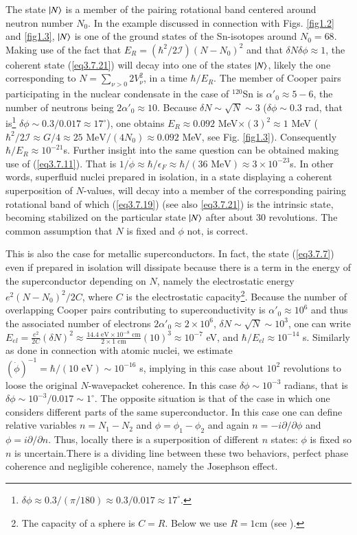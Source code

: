 The state $|{N} \rangle$ is a member of the pairing rotational band centered around neutron number $N_0$. In the example discussed in connection with Figs. \ref{fig1.2} and \ref{fig1.3}, $|{N} \rangle$ is one of the ground states of the Sn-isotopes around $N_0=68$. Making use of the fact that $E_R=\left(\hbar^2/2\mathcal I\right)(N-N_0)^2$ and that $\delta N\delta\phi\approx1$, the coherent state (\ref{eq3.7.21}) will decay into one of the states $|{N} \rangle$, likely the one corresponding to $N=\sum_{\nu>0}2V_\nu^2$, in a time $\hbar/E_R$. The member of  Cooper pairs participating in the nuclear condensate in the case of $^{120}$Sn is $\alpha'_0\approx5-6$, the number of neutrons being $2\alpha'_0\approx10$. Because $\delta N\sim\sqrt{N}\sim3$ ($\delta\phi\sim0.3$ rad, that is\footnote{$\delta\phi\approx0.3/(\pi/180)\approx0.3/0.017\approx17^\circ$.} $\delta\phi\sim0.3/0.017\approx 17^\circ$), one obtains $E_R\approx0.092$ MeV$\times(3)^2\approx 1$ MeV ($\hbar^2/2\mathcal I\approx G/4\approx 25\text{ MeV}/(4N_0)\approx0.092$ MeV, see Fig. \ref{fig1.3}). Consequently $\hbar/E_R\approx10^{-21}$s. Further insight into the same question can be obtained making use of (\ref{eq3.7.11}). That is $1/\dot\phi\approx\hbar/\epsilon_F\approx\hbar/(36\text{ MeV})\approx3\times10^{-23}$s. In other words, superfluid nuclei prepared in isolation, in a state displaying a coherent superposition of $N$-values, will decay into a member of the corresponding pairing rotational band of which (\ref{eq3.7.19}) (see also \ref{eq3.7.21}) is the intrinsic state, becoming stabilized on the particular state $|{N} \rangle$ after about 30 revolutions. The common assumption that $N$ is fixed and $\phi$ not, is correct.


This is also the case for metallic superconductors. In fact, the state (\ref{eq3.7.7}) even if prepared in isolation will dissipate because there is a term in the energy of the superconductor depending on $N$, namely the electrostatic energy $e^2(N-N_0)^2/2C$, where $C$ is the electrostatic capacity\footnote{The capacity of a sphere is $C=R$. Below we use $R=1$cm (see \cite{Anderson:64b}).}. Because the number of overlapping Cooper pairs contributing to superconductivity is $\alpha'_0\approx10^6$ and thus the associated number of electrons $2\alpha'_0\approx2\times10^6$, $\delta N\sim\sqrt{N}\sim10^3$, one can write $E_{el}=\frac{e^2}{2C}(\delta N)^2\approx\frac{14.4\text{ eV}\times10^{-8}\text{ cm}}{2\times1\text{ cm}}(10)^3\approx10^{-7}$ eV, and $\hbar/E_{el}\approx 10^{-14}$ s. Similarly as done in connection with atomic nuclei, we estimate $(\dot\phi)^{-1}=\hbar/(10\text{ eV})\sim10^{-16}$ s, implying in this case about $10^2$ revolutions to loose the original $N$-wavepacket coherence. In this case $\delta\phi\sim10^{-3}$ radians, that is $\delta\phi\sim10^{-3}/0.017\sim1^{\circ}$.   
The opposite situation is that of the case in which one considers different parts of the same superconductor. In this case one can define relative variables $n=N_1-N_2$ and $\phi=\phi_1-\phi_2$ and again $n=-i\partial/\partial \phi$ and $\phi=i\partial/\partial n$. Thus, locally there is a superposition of different $n$ states: $\phi$ is fixed so $n$ is uncertain.There is  a dividing line between these two behaviors, perfect phase coherence and negligible coherence, namely the Josephson effect.


